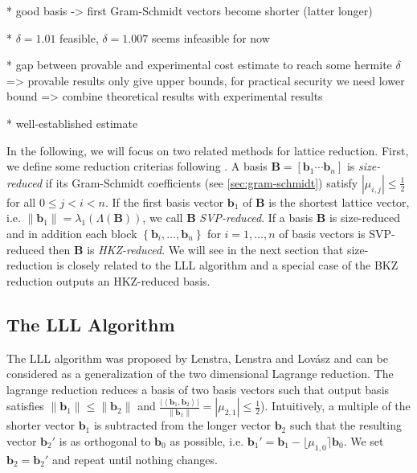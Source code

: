 * good basis -> first Gram-Schmidt vectors become shorter (latter longer)

* $\delta = 1.01$ feasible, $\delta = 1.007$ seems infeasible for now

* gap between provable and experimental cost estimate to reach some hermite $\delta$ => provable results only give upper bounds, for practical security we need lower bound => combine theoretical results with experimental results

* well-established estimate \cite{LP11}






In the following, we will focus on two related methods for lattice reduction. %
First, we define some reduction criterias following \cite{ABLR21}. %
A basis $\mathbf{B} = \left[\mathbf{b}_1 \cdots \mathbf{b}_n\right]$ is \textit{size-reduced} if its Gram-Schmidt coefficients (see \cref{sec:gram-schmidt}) satisfy $|\mu_{i,j}| \leq \frac{1}{2}$ for all $0\leq j < i < n$. If the first basis vector $\mathbf{b}_1$ of $\mathbf{B}$ is the shortest lattice vector, i.e. $\|\mathbf{b}_1\| = \lambda_1(\Lambda(\mathbf{B}))$, we call $\mathbf{B}$ \textit{SVP-reduced}. If a basis $\mathbf{B}$ is size-reduced and in addition each block $\left\{\mathbf{b}_i, \dots, \mathbf{b}_n\right\}$ for $i=1, \dots, n$ of basis vectors is SVP-reduced then $\mathbf{B}$ is \textit{HKZ-reduced}. We will see in the next section that size-reduction is closely related to the LLL algorithm and a special case of the BKZ reduction outputs an HKZ-reduced basis.

\subsection{The LLL Algorithm}
The LLL algorithm was proposed by Lenstra, Lenstra and Lovász \cite{LLL82} and can be considered as a generalization of the two dimensional Lagrange reduction. The lagrange reduction reduces a basis of two basis vectors such that output basis satisfies $\|\mathbf{b}_1\| \leq \|\mathbf{b}_2\|$ and $\frac{|\left\langle\mathbf{b}_1, \mathbf{b}_2\right\rangle|}{\|\mathbf{b}_1\|} = |\mu_{2,1}| \leq \frac{1}{2}$). Intuitively, a multiple of the shorter vector $\mathbf{b}_1$ is subtracted from the longer vector $\mathbf{b}_2$ such that the resulting vector $\mathbf{b}_2'$ is as orthogonal to $\mathbf{b}_0$ as possible, i.e.  $\mathbf{b}_1' =  \mathbf{b}_1 - \lfloor\mu_{1,0}\rceil \mathbf{b}_0$. We set $\mathbf{b}_2 = \mathbf{b}_2'$ and repeat until nothing changes.

